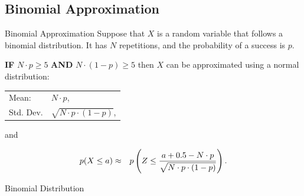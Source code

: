 \subsection{Binomial Approximation}

\begin{frame}

  \begin{block}{Binomial Approximation}
    Suppose that $X$ is a random variable that follows a binomial
    distribution. It has $N$ repetitions, and the probability of a
    success is $p$. 

    \textbf{IF} $N\cdot p\geq 5$ \textbf{AND} $N\cdot (1-p) \geq 5$
    then $X$ can be approximated using a normal distribution:

    \begin{center}
      \begin{tabular}{ll}
        Mean: & $N\cdot p$, \\
        Std. Dev. & $\sqrt{N\cdot p \cdot (1-p)}$,
      \end{tabular}
    \end{center}

    and

    \begin{eqnarray*}
      p(X \leq a) & \approx &
       p\left( Z \leq \frac{a+0.5-N\cdot p}{\sqrt{N\cdot p \cdot (1-p)}}\right).
    \end{eqnarray*}

  \end{block}

\end{frame}

\begin{frame}{Binomial Distribution}

  
\end{frame}

